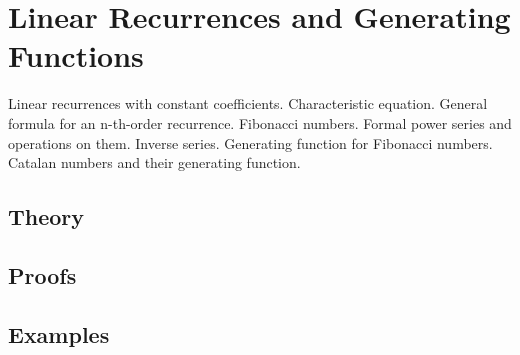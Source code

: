 
\section{Linear Recurrences and Generating Functions}
\label{sec:2.2.06-recurrences-generating}

\begin{ticket}
Linear recurrences with constant coefficients. Characteristic equation. General formula for an n-th-order recurrence. Fibonacci numbers. Formal power series and operations on them. Inverse series. Generating function for Fibonacci numbers. Catalan numbers and their generating function.
\end{ticket}

\subsection*{Theory}

\subsection*{Proofs}

\subsection*{Examples}
